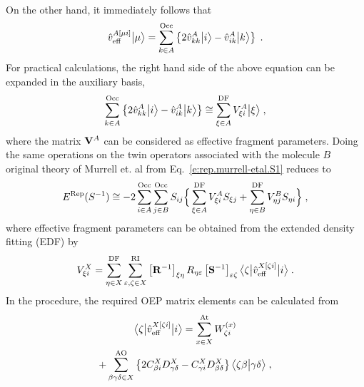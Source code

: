 %
\\ On the other hand, it immediately follows that
%
\begin{equation}
 \hat{v}^{A[\mu i]}_{\rm eff} \Ket{\mu} = 
  \sum_{k\in A}^{\rm Occ} \left\{
     2\hat{v}^A_{kk} \Ket{i} - \hat{v}^A_{ik} \Ket{k}
  \right\} \;.
\end{equation}
%
For practical calculations, the right hand side of the above equation can be expanded 
in the auxiliary basis,
%
\begin{equation} \label{e:v-oep.rep}
  \sum_{k\in A}^{\rm Occ} \left\{
     2\hat{v}^A_{kk} \Ket{i} - \hat{v}^A_{ik} \Ket{k}
  \right\} \cong
  \sum_{\xi\in A}^{\rm DF} 
  V_{\xi i}^A \Ket{\xi} \;,
\end{equation}
%
where the matrix ${\bf V}^A$ can be considered as effective fragment parameters.
Doing the same operations on the twin operators associated with the molecule $B$
original theory of Murrell et. al from Eq.~\eqref{e:rep.murrell-etal.S1}
reduces to
%
\begin{equation} \label{e:rep.murrell-etal.S1.oep}
    E^{\rm Rep}(S^{-1}) \cong 
 -2\sum_{i\in A}^{\rm Occ} \sum_{j\in B}^{\rm Occ}
               S_{ij} \Big\{
           \sum_{\xi \in A}^{\rm DF} V_{\xi i}^A S_{\xi j}
         + \sum_{\eta\in B}^{\rm DF} V_{\eta j}^B S_{\eta i}
                \Big\} \;,
\end{equation}
%
where 
effective fragment parameters
can be obtained 
from the extended density fitting\cite{Blasiak.Bednarska.Choluj.Bartkowiak.JCP.2019} (EDF)
by
%
\begin{equation} \label{e:rep.murrell-etal.S1.oep-edf}
            V_{\xi i}^X = \sum_{\eta\in X}^{\rm DF} 
                          \sum_{\varepsilon,\zeta\in X}^{\rm RI}
                          \left[ {\bf R}^{-1} \right]_{\xi\eta} R_{\eta\varepsilon} 
                          \left[ {\bf S}^{-1} \right]_{\varepsilon\zeta} 
                          \tBraKet{\zeta}{\hat{v}_{\rm eff}^{X[\zeta i]}}{i}
                \;.
\end{equation}
%
In the procedure, the required OEP matrix elements can be calculated from
%
\begin{multline} \label{e:rep.murrell-etal.S1.oep-v}
   \tBraKet{\zeta}{\hat{v}_{\rm eff}^{X[\zeta i]}}{i}
     = \sum_{x\in X}^{\rm At} W_{\zeta i}^{(x)} \\
        + \sum_{\beta\gamma\delta\in X}^{\rm AO}
           \left\{ 
             2 C_{\beta i}^X D_{\gamma\delta}^X - C_{\gamma i}^X D_{\beta \delta}^X
           \right\}
           \BraKet{\zeta\beta}{\gamma\delta} \;,
\end{multline}
